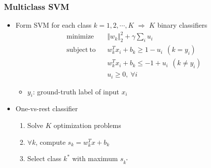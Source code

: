\subsubsection*{Multiclass SVM}
\begin{itemize}
    \item Form SVM for each class $k=1,2,\cdots,K$ $\Rightarrow$ $K$ binary classifiers
    \begin{equation}\begin{aligned}
        \mathrm{minimize}~~&~~\Vert w_k\Vert_2^2+\gamma\sum_{i}u_i \\
        \mathrm{subject~to}~~&~~w_k^Tx_i+b_k\geq1-u_i~~(k=y_i) \\
            &~~w_k^Tx_i+b_k\leq-1+u_i~~(k\neq y_i) \\
            &~~u_i\geq0,~\forall i
    \end{aligned}\end{equation}
    \begin{itemize}
        \item $y_i$: ground-truth label of input $x_i$
    \end{itemize}
    \item One-vs-rest classifier
    \begin{enumerate}
        \item Solve $K$ optimization problems
        \item $\forall k$, compute $s_k=w_k^Tx+b_k$
        \item Select class $k^\ast$ with maximum $s_{k^\ast}$
    \end{enumerate}
    \begin{figures}
    \end{figures}
\end{itemize}

